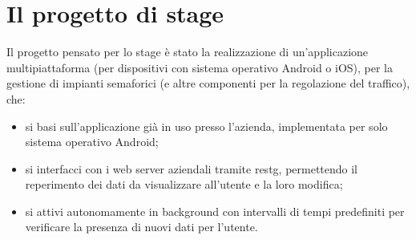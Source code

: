 \section{Il progetto di stage}
\label{sec:progetto-stage}

Il progetto pensato per lo stage è stato la realizzazione di un'applicazione multipiattaforma (per dispositivi con sistema operativo Android o iOS), per la gestione di impianti semaforici (e altre componenti per la regolazione del traffico), che:
\begin{itemize}
    \item si basi sull'applicazione già in uso presso l'azienda, implementata per solo sistema operativo Android;
    \item si interfacci con i web server aziendali tramite \gls{restg}, permettendo il reperimento dei dati da visualizzare all'utente e la loro modifica;
    \item si attivi autonomamente in background con intervalli di tempi predefiniti per verificare la presenza di nuovi dati per l'utente.
\end{itemize}